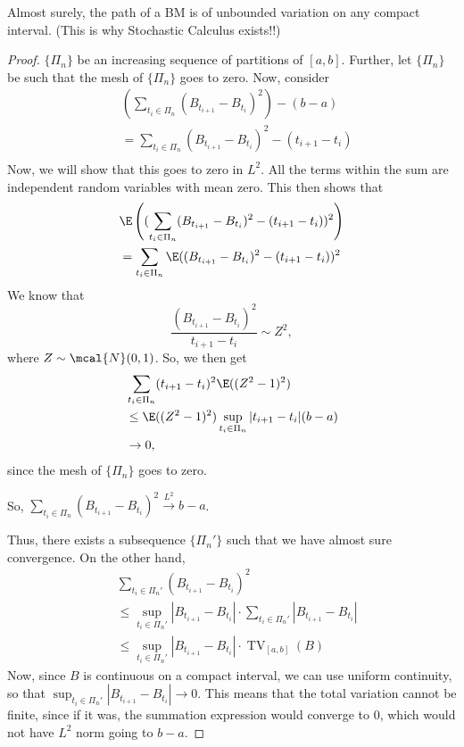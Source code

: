 \begin{theorem}
Almost surely, the path of a BM is of unbounded variation on any compact interval. (This is why Stochastic Calculus exists!!)
\end{theorem}
\begin{proof}
$\{\Pi_n\}$ be an increasing sequence of partitions of $[a,b]$. Further, let $\{\Pi_n\}$ be such that the mesh of $\{\Pi_n\}$ goes to zero. Now, consider
\begin{align*}
&\left(\sum_{t_i \in \Pi_n} (B_{t_{i+1}}-B_{t_i})^2\right) - (b-a) \\
&= \sum_{t_i \in \Pi_n} (B_{t_{i+1}}-B_{t_i})^2 - (t_{i+1}-t_i) \\
\end{align*}
Now, we will show that this goes to zero in $L^2$. All the terms within the sum are independent random variables with mean zero. This then shows that
\begin{align*}
&\E\left((\sum_{t_i \in \Pi_n} (B_{t_{i+1}}-B_{t_i})^2 - (t_{i+1}-t_i))^2\right) \\
&= \sum_{t_i \in \Pi_n} \E((B_{t_{i+1}}-B_{t_i})^2 - (t_{i+1}-t_i))^2
\end{align*}
We know that
\[
\frac{(B_{t_{i+1}}-B_{t_i})^2}{t_{i+1}-t_i} \sim Z^2,
\]
where $Z \sim \mcal{N}(0,1)$. So, we then get
\begin{align*}
&\sum_{t_i \in \Pi_n} (t_{i+1}-t_i)^2 \E((Z^2-1)^2) \\
& \le \E((Z^2-1)^2)  \sup_{t_i \in \Pi_n} |t_{i+1}-t_i| (b-a) \\
&\to 0,
\end{align*}
since the mesh of $\{\Pi_n\}$ goes to zero.

So, $\sum_{t_i \in \Pi_n} (B_{t_{i+1}} - B_{t_i})^2 \overset{L^2}{\to} b-a$.

Thus, there exists a subsequence $\{\Pi_n'\}$ such that we have almost sure convergence. On the other hand,
\begin{align*}
&\sum_{t_i \in \Pi_n'} (B_{t_{i+1}}-B_{t_i})^2 \\
&\le \sup_{t_i \in \Pi_n'} |B_{t_{i+1}}-B_{t_i}| \cdot \sum_{t_i \in \Pi_n'}|B_{t_{i+1}}-B_{t_i}| \\
&\le \sup_{t_i \in \Pi_n'} |B_{t_{i+1}}-B_{t_i}|  \cdot \operatorname{TV}_{[a,b]}(B)
\end{align*}
Now, since $B$ is continuous on a compact interval, we can use uniform continuity, so that $\sup_{t_i \in \Pi_n'} |B_{t_{i+1}}-B_{t_i}|  \to 0$. This means that the total variation cannot be finite, since if it was, the summation expression would converge to 0, which would not have $L^2$ norm going to $b-a$.
\end{proof}
